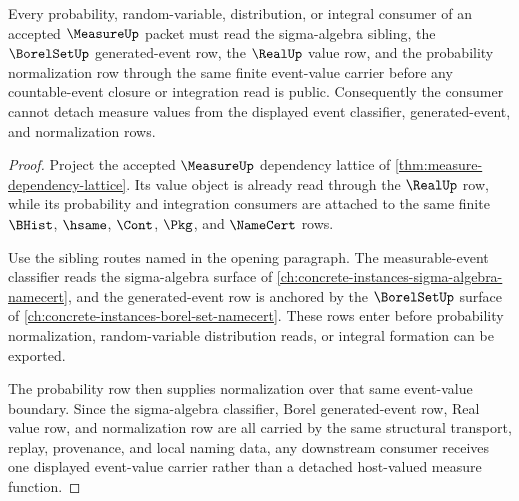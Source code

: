 \begin{theorem}
\label{thm:measure-probability-sigma-borel-route}
Every probability, random-variable, distribution, or integral consumer of an accepted $\MeasureUp$ packet must read the sigma-algebra sibling, the $\BorelSetUp$ generated-event row, the $\RealUp$ value row, and the probability normalization row through the same finite event-value carrier before any countable-event closure or integration read is public. Consequently the consumer cannot detach measure values from the displayed event classifier, generated-event, and normalization rows.
\end{theorem}
\begin{proof}
Project the accepted $\MeasureUp$ dependency lattice of \autoref{thm:measure-dependency-lattice}. Its value object is already read through the $\RealUp$ row, while its probability and integration consumers are attached to the same finite $\BHist$, $\hsame$, $\Cont$, $\Pkg$, and $\NameCert$ rows.

Use the sibling routes named in the opening paragraph. The measurable-event classifier reads the sigma-algebra surface of \autoref{ch:concrete-instances-sigma-algebra-namecert}, and the generated-event row is anchored by the $\BorelSetUp$ surface of \autoref{ch:concrete-instances-borel-set-namecert}. These rows enter before probability normalization, random-variable distribution reads, or integral formation can be exported.

The probability row then supplies normalization over that same event-value boundary. Since the sigma-algebra classifier, Borel generated-event row, Real value row, and normalization row are all carried by the same structural transport, replay, provenance, and local naming data, any downstream consumer receives one displayed event-value carrier rather than a detached host-valued measure function.
\end{proof}
